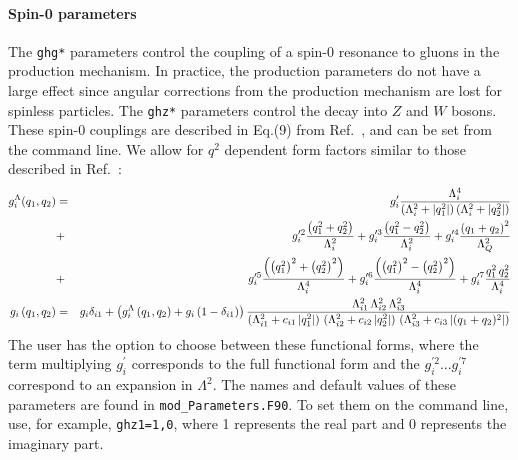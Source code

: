 \documentclass[aps,superscriptaddress,nofootinbib]{revtex4}
\begin{document}
\paragraph{Spin-0 parameters}
\label{spin0}

\noindent
The \verb|ghg*| parameters control the coupling of a spin-0 resonance to gluons in the production mechanism.
In practice, the production parameters do not have a large effect since angular corrections from the production mechanism are lost for spinless particles.
The \verb|ghz*| parameters control the decay into $Z$ and $W$ bosons.
These spin-0 couplings are described in Eq.(9) from Ref.~\cite{Bolognesi:2012}, and can be set from the command line.
We allow for $q^2$ dependent form factors similar to those described in Ref.~\cite{Anderson:2013}:
\begin{eqnarray*}
	g^\Lambda_i(q_1,q_2) &=&
	g_i' \frac{\Lambda_i^4}{\left(\Lambda_i^2 + |q_1^2|\right)\left(\Lambda_i^2 + |q_2^2|\right)} \\
	&+& g_i^{\prime 2}  \frac{\left(q_1^2+q_2^2\right)}{\Lambda_i^2}
	+ g_i^{\prime 3}  \frac{\left(q_1^2-q_2^2\right)}{\Lambda_i^2}
	+ g_i^{\prime 4}  \frac{\left(q_1+q_2\right)^2}{\Lambda_Q^2} \\
	&+& g_i^{\prime 5}  \frac{\left(\left(q_1^2\right)^2+\left(q_2^2\right)^2\right)}{\Lambda_i^4}
	+ g_i^{\prime 6}  \frac{\left(\left(q_1^2\right)^2-\left(q_2^2\right)^2\right)}{\Lambda_i^4}
	+ g_i^{\prime 7}  \frac{q_1^2 \, q_2^2}{\Lambda_i^4} \\
	g_i\left(q_1,q_2\right) &=& g_i \delta_{i1} + \left(g^\Lambda_i \left(q_1,q_2\right) + g_i \left(1- \delta_{i1}\right)\right)
	\frac{\Lambda^2_{i1}\,\Lambda^2_{i2}\,\Lambda^2_{i3}}
	{\left(\Lambda^2_{i1}+c_{i1}\left|q_1^2\right|\right)\,\left(\Lambda^2_{i2}+c_{i2}\left|q_2^2\right|\right)\,\left(\Lambda^2_{i3}+c_{i3}\left|(q_1+q_2)^2\right|\right)}
	\noindent
\end{eqnarray*}
The user has the option to choose between these functional forms,
where the term multiplying $g_i^\prime$ corresponds to the full functional form and the $g_i^{\prime 2}... g_i^{\prime 7}$ correspond to an expansion in $\Lambda^2$.
The names and default values of these parameters are found in \verb|mod_Parameters.F90|.  To set them on the command line, use, for example, \verb|ghz1=1,0|, where 1 represents the real part and 0 represents the imaginary part.
\end{document}
